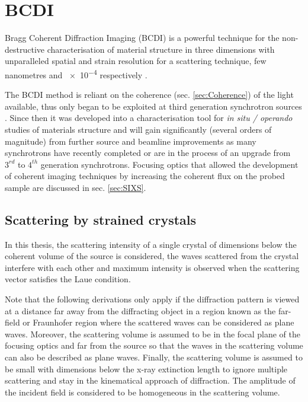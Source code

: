 \section{BCDI} \label{sec:BCDI}

Bragg Coherent Diffraction Imaging (BCDI) \parencite{robinson_coherent_2009} is a powerful technique for the non-destructive characterisation of material structure in three dimensions with unparalleled spatial and strain resolution for a scattering technique, few nanometres \parencite{labat_inversion_2015,cherukara_anisotropic_2018} and \num{e-4} respectively \parencite{Newton2010,Lauraux2020}.

The BCDI method is reliant on the coherence (sec. \ref{sec:Coherence}) of the light available, thus only began to be exploited at third generation synchrotron sources \parencite{Miao1999,Miao2000,Robinson2001}.
Since then it was developed into a characterisation tool for \textit{in situ / operando} studies of materials structure \parencite{ulvestad_situ_2016,Kim2019,Carnis2021} and will gain significantly (several orders of magnitude) from further source and beamline improvements as many synchrotrons have recently completed or are in the process of an upgrade from $3^{rd}$ to $4^{th}$ generation synchrotrons.
Focusing optics that allowed the development of coherent imaging techniques by increasing the coherent flux on the probed sample are discussed in sec. \ref{sec:SIXS}.

\subsection{Scattering by strained crystals}\label{sec:StrainBCDI}

In this thesis, the scattering intensity of a single crystal of dimensions below the coherent volume of the source is considered, the waves scattered from the crystal interfere with each other and maximum intensity is observed when the scattering vector satisfies the Laue condition.

Note that the following derivations only apply if the diffraction pattern is viewed at a distance far away from the diffracting object in a region known as the far-field or Fraunhofer region \parencite{Willmott} where the scattered waves can be considered as plane waves.
Moreover, the scattering volume is assumed to be in the focal plane of the focusing optics and far from the source so that the waves in the scattering volume can also be described as plane waves.
Finally, the scattering volume is assumed to be small with dimensions below the x-ray extinction length to ignore multiple scattering and stay in the kinematical approach of diffraction.
The amplitude of the incident field is considered to be homogeneous in the scattering volume.


